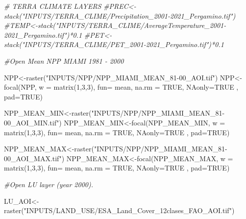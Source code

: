\documentclass[
  10pt,
  b5paper,
]{book}
\newenvironment{Shaded}{\begin{snugshade}}{\end{snugshade}}
\newcommand{\AttributeTok}[1]{\textcolor[rgb]{0.77,0.63,0.00}{#1}}
\newcommand{\CommentTok}[1]{\textcolor[rgb]{0.56,0.35,0.01}{\textit{#1}}}
\newcommand{\ConstantTok}[1]{\textcolor[rgb]{0.00,0.00,0.00}{#1}}
\newcommand{\DecValTok}[1]{\textcolor[rgb]{0.00,0.00,0.81}{#1}}
\newcommand{\FunctionTok}[1]{\textcolor[rgb]{0.00,0.00,0.00}{#1}}
\newcommand{\NormalTok}[1]{#1}
\newcommand{\OtherTok}[1]{\textcolor[rgb]{0.56,0.35,0.01}{#1}}
\newcommand{\StringTok}[1]{\textcolor[rgb]{0.31,0.60,0.02}{#1}}
\begin{document}
\begin{Shaded}
\begin{Highlighting}[]
\CommentTok{\# TERRA CLIMATE LAYERS}
\CommentTok{\#PREC\textless{}{-}stack("INPUTS/TERRA\_CLIME/Precipitation\_2001{-}2021\_Pergamino.tif")}
\CommentTok{\#TEMP\textless{}{-}stack("INPUTS/TERRA\_CLIME/AverageTemperature\_2001{-}2021\_Pergamino.tif")*0.1}
\CommentTok{\#PET\textless{}{-}stack("INPUTS/TERRA\_CLIME/PET\_2001{-}2021\_Pergamino.tif")*0.1}

\CommentTok{\#Open Mean NPP MIAMI 1981 {-} 2000}

\NormalTok{NPP}\OtherTok{\textless{}{-}}\FunctionTok{raster}\NormalTok{(}\StringTok{"INPUTS/NPP/NPP\_MIAMI\_MEAN\_81{-}00\_AOI.tif"}\NormalTok{)}
\NormalTok{NPP}\OtherTok{\textless{}{-}}\FunctionTok{focal}\NormalTok{(NPP, }\AttributeTok{w =} \FunctionTok{matrix}\NormalTok{(}\DecValTok{1}\NormalTok{,}\DecValTok{3}\NormalTok{,}\DecValTok{3}\NormalTok{), }\AttributeTok{fun=}\NormalTok{ mean,  }\AttributeTok{na.rm =} \ConstantTok{TRUE}\NormalTok{, }\AttributeTok{NAonly=}\ConstantTok{TRUE}\NormalTok{ , }\AttributeTok{pad=}\ConstantTok{TRUE}\NormalTok{)}

\NormalTok{NPP\_MEAN\_MIN}\OtherTok{\textless{}{-}}\FunctionTok{raster}\NormalTok{(}\StringTok{"INPUTS/NPP/NPP\_MIAMI\_MEAN\_81{-}00\_AOI\_MIN.tif"}\NormalTok{)}
\NormalTok{NPP\_MEAN\_MIN}\OtherTok{\textless{}{-}}\FunctionTok{focal}\NormalTok{(NPP\_MEAN\_MIN, }\AttributeTok{w =} \FunctionTok{matrix}\NormalTok{(}\DecValTok{1}\NormalTok{,}\DecValTok{3}\NormalTok{,}\DecValTok{3}\NormalTok{), }\AttributeTok{fun=}\NormalTok{ mean,  }\AttributeTok{na.rm =} \ConstantTok{TRUE}\NormalTok{, }\AttributeTok{NAonly=}\ConstantTok{TRUE}\NormalTok{ , }\AttributeTok{pad=}\ConstantTok{TRUE}\NormalTok{)}

\NormalTok{NPP\_MEAN\_MAX}\OtherTok{\textless{}{-}}\FunctionTok{raster}\NormalTok{(}\StringTok{"INPUTS/NPP/NPP\_MIAMI\_MEAN\_81{-}00\_AOI\_MAX.tif"}\NormalTok{)}
\NormalTok{NPP\_MEAN\_MAX}\OtherTok{\textless{}{-}}\FunctionTok{focal}\NormalTok{(NPP\_MEAN\_MAX, }\AttributeTok{w =} \FunctionTok{matrix}\NormalTok{(}\DecValTok{1}\NormalTok{,}\DecValTok{3}\NormalTok{,}\DecValTok{3}\NormalTok{), }\AttributeTok{fun=}\NormalTok{ mean,  }\AttributeTok{na.rm =} \ConstantTok{TRUE}\NormalTok{, }\AttributeTok{NAonly=}\ConstantTok{TRUE}\NormalTok{ , }\AttributeTok{pad=}\ConstantTok{TRUE}\NormalTok{)}

\CommentTok{\#Open LU layer (year 2000).}

\NormalTok{LU\_AOI}\OtherTok{\textless{}{-}}\FunctionTok{raster}\NormalTok{(}\StringTok{"INPUTS/LAND\_USE/ESA\_Land\_Cover\_12clases\_FAO\_AOI.tif"}\NormalTok{)}


\end{Highlighting}
\end{Shaded}
\end{document}
